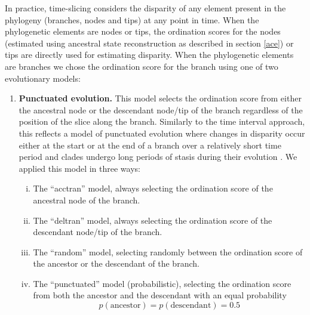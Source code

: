 \documentclass[12pt,a4paper]{article}
\begin{document}
In practice, time-slicing considers the disparity of any element present in the phylogeny (branches, nodes and tips) at any point in time.
When the phylogenetic elements are nodes or tips, the ordination scores for the nodes (estimated using ancestral state reconstruction as described in section \ref{ace}) or tips are directly used for estimating disparity.
When the phylogenetic elements are branches we chose the ordination score for the branch using one of two evolutionary models:



\begin{enumerate}

    \item{\textbf{Punctuated evolution.}} 
    This model selects the ordination score from either the ancestral node or the descendant node/tip of the branch regardless of the position of the slice along the branch. 
    Similarly to the time interval approach, this reflects a model of punctuated evolution where changes in disparity occur either at the start or at the end of a branch over a relatively short time period and clades undergo long periods of stasis during their evolution \citep{Gould1977,Hunt20112007}.
    We applied this model in three ways: 
    \begin{enumerate}[(i)]


      \item The ``acctran'' model, always selecting the ordination score of the ancestral node of the branch.
      \item The ``deltran'' model, always selecting the ordination score of the descendant node/tip of the branch.
      \item The ``random'' model, selecting randomly between the ordination score of the ancestor or the descendant of the branch.
      \item The ``punctuated'' model (probabilistic), selecting the ordination score from both the ancestor and the descendant with an equal probability
          \begin{equation}
          p(\text{ancestor}) = p(\text{descendant}) = 0.5
          \end{equation}

    \end{enumerate}


\end{enumerate}
\end{document}
